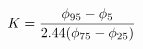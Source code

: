\documentclass[10pt]{article}
\begin{document}
\begin{align*}K = {{\phi_{95} - \phi_{5}} \over {2.44(\phi_{75} - \phi_{25} )}}\end{align*}
\end{document}
